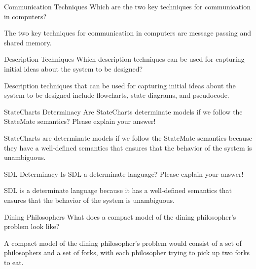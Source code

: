 \documentclass{article}
\begin{document}
\begin{exercise}{Communication Techniques}
  Which are the two key techniques for communication in computers?

  \begin{solution}
    The two key techniques for communication in computers are message passing and shared memory.
  \end{solution}
\end{exercise}

\begin{exercise}{Description Techniques}
  Which description techniques can be used for capturing initial ideas about the system to be designed?

  \begin{solution}
    Description techniques that can be used for capturing initial ideas about the system to be designed include flowcharts, state diagrams, and pseudocode.
  \end{solution}
\end{exercise}

\begin{exercise}{StateCharts Determinacy}
  Are StateCharts determinate models if we follow the StateMate semantics? Please explain your answer!

  \begin{solution}
    StateCharts are determinate models if we follow the StateMate semantics because they have a well-defined semantics that ensures that the behavior of the system is unambiguous.
  \end{solution}
\end{exercise}

\begin{exercise}{SDL Determinacy}
  Is SDL a determinate language? Please explain your answer!

  \begin{solution}
    SDL is a determinate language because it has a well-defined semantics that ensures that the behavior of the system is unambiguous.
  \end{solution}
\end{exercise}

\begin{exercise}{Dining Philosophers}
  What does a compact model of the dining philosopher's problem look like?

  \begin{solution}
    A compact model of the dining philosopher's problem would consist of a set of philosophers and a set of forks, with each philosopher trying to pick up two forks to eat.
  \end{solution}
\end{exercise}
\end{document}
